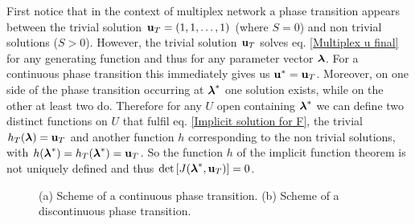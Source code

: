 \documentclass[
11pt, %
english, %
singlespacing, %
liststotoc, %
headsepline, %
]{MastersDoctoralThesis} %
\begin{document}
First notice that in the context of multiplex network a phase transition appears between the trivial solution $\boldsymbol{\mathrm{u}}_T = (1, 1, \dots, 1)$ (where $S = 0$) and non trivial solutions ($S > 0$). However, the trivial solution $\boldsymbol{\mathrm{u}}_T$ solves eq. \eqref{Multiplex u final} for any generating function and thus for any parameter vector $\boldsymbol{\mathrm{\lambda}}$. For a continuous phase transition this immediately gives us $\boldsymbol{\mathrm{u}}^* = \boldsymbol{\mathrm{u}}_T$. Moreover, on one side of the phase transition occurring at $\boldsymbol{\mathrm{\lambda}}^*$ one solution exists, while on the other at least two do. Therefore for any $U$ open containing $\boldsymbol{\mathrm{\lambda}}^*$ we can define two distinct functions on $U$ that fulfil eq. \eqref{Implicit solution for F}, the trivial $h_T(\boldsymbol{\mathrm{\lambda}}) = \boldsymbol{\mathrm{u}}_T$ and another function $h$ corresponding to the non trivial solutions, with $h(\boldsymbol{\mathrm{\lambda}}^*) = h_T(\boldsymbol{\mathrm{\lambda}}^*) = \boldsymbol{\mathrm{u}}_T$. So the function $h$ of the implicit function theorem is not uniquely defined and thus $\det\left[ J(\boldsymbol{\mathrm{\lambda}}^*, \boldsymbol{\mathrm{u}}_T) \right] = 0$.

\begin{figure}
	\hfill
	\caption{(a) Scheme of a continuous phase transition. (b) Scheme of a discontinuous phase transition.}
	\label{Figure: Scheme of continuous and discontinuous phase transitions}
\end{figure}
\end{document}
